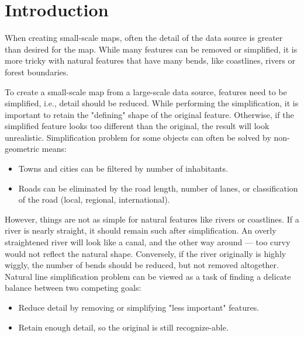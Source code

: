 \documentclass[a4paper]{article}
\begin{document}
\newpage

\section{Introduction}
\label{sec:introduction}

When creating small-scale maps, often the detail of the data source is greater
than desired for the map. While many features can be removed or simplified, it
is more tricky with natural features that have many bends, like coastlines,
rivers or forest boundaries.

To create a small-scale map from a large-scale data source, features need to be
simplified, i.e., detail should be reduced. While performing the
simplification, it is important to retain the "defining" shape of the original
feature. Otherwise, if the simplified feature looks too different than the
original, the result will look unrealistic. Simplification problem for some
objects can often be solved by non-geometric means:

\begin{itemize}
    \item Towns and cities can be filtered by number of inhabitants.
    \item Roads can be eliminated by the road length, number of lanes, or
        classification of the road (local, regional, international).
\end{itemize}

However, things are not as simple for natural features like rivers or
coastlines. If a river is nearly straight, it should remain such after
simplification. An overly straightened river will look like a canal, and the
other way around --- too curvy would not reflect the natural shape. Conversely,
if the river originally is highly wiggly, the number of bends should be
reduced, but not removed altogether. Natural line simplification problem can be
viewed as a task of finding a delicate balance between two competing goals:

\begin{itemize}
    \item Reduce detail by removing or simplifying "less important" features.
    \item Retain enough detail, so the original is still recognize-able.
\end{itemize}
\end{document}
